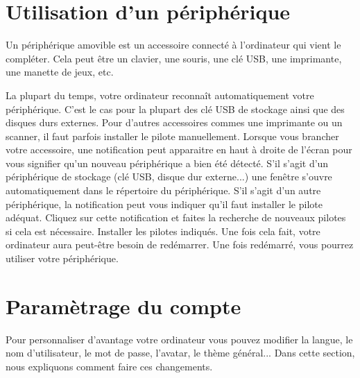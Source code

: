 \documentclass[12pt]{book}
\begin{document}
\section{Utilisation d'un périphérique}
	Un périphérique amovible est un accessoire connecté à l'ordinateur qui vient le compléter.
	Cela peut être un clavier, une souris, une clé USB, une imprimante, une manette de jeux, etc.\par
	La plupart du temps, votre ordinateur reconnaît automatiquement votre périphérique.
	C'est le cas pour la plupart des clé USB de stockage ainsi que des disques durs externes.
	Pour d'autres accessoires commes une imprimante ou un scanner, il faut parfois installer le pilote manuellement.
	Lorsque vous brancher votre accessoire, une notification peut apparaitre en haut à droite de l'écran pour vous signifier qu'un nouveau périphérique a bien été détecté.
	S'il s'agit d'un périphérique de stockage (clé USB, disque dur externe...) une fenêtre s'ouvre automatiquement dans le répertoire du périphérique.
	S'il s'agit d'un autre périphérique, la notification peut vous indiquer qu'il faut installer le pilote adéquat.
	Cliquez sur cette notification et faites la recherche de nouveaux pilotes si cela est nécessaire.
	Installer les pilotes indiqués.
	Une fois cela fait, votre ordinateur aura peut-être besoin de redémarrer.
	Une fois redémarré, vous pourrez utiliser votre périphérique.
\section{Paramètrage du compte}
	Pour personnaliser d'avantage votre ordinateur vous pouvez modifier la langue, le nom d'utilisateur, le mot de passe, l'avatar, le thème général...
	Dans cette section, nous expliquons comment faire ces changements.
\end{document}
